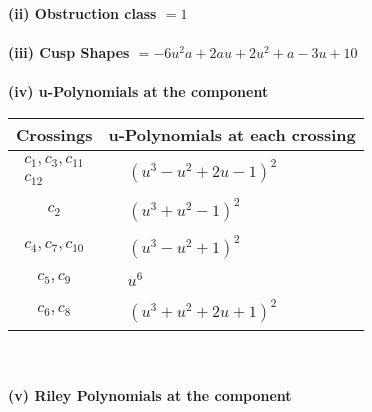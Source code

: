 \documentclass[1p]{elsarticle_modified}
\theoremstyle{definition}
\begin{document}
\flushleft \textbf{(ii) Obstruction class $= 1$}\\~\\
\flushleft \textbf{(iii) Cusp Shapes $= -6 u^2 a+2 a u+2 u^2+a-3 u+10$}\\~\\
\newpage\renewcommand{\arraystretch}{1}
\flushleft \textbf{(iv) u-Polynomials at the component}\newline \\
\begin{tabular}{m{50pt}|m{274pt}}
Crossings & \hspace{64pt}u-Polynomials at each crossing \\
\hline $$\begin{aligned}c_{1},c_{3},c_{11}\\c_{12}\end{aligned}$$&$\begin{aligned}
&(u^3- u^2+2 u-1)^2
\end{aligned}$\\
\hline $$\begin{aligned}c_{2}\end{aligned}$$&$\begin{aligned}
&(u^3+u^2-1)^2
\end{aligned}$\\
\hline $$\begin{aligned}c_{4},c_{7},c_{10}\end{aligned}$$&$\begin{aligned}
&(u^3- u^2+1)^2
\end{aligned}$\\
\hline $$\begin{aligned}c_{5},c_{9}\end{aligned}$$&$\begin{aligned}
&u^6
\end{aligned}$\\
\hline $$\begin{aligned}c_{6},c_{8}\end{aligned}$$&$\begin{aligned}
&(u^3+u^2+2 u+1)^2
\end{aligned}$\\
\hline
\end{tabular}\\~\\
\newpage\renewcommand{\arraystretch}{1}
\flushleft \textbf{(v) Riley Polynomials at the component}\newline \\
\end{document}
